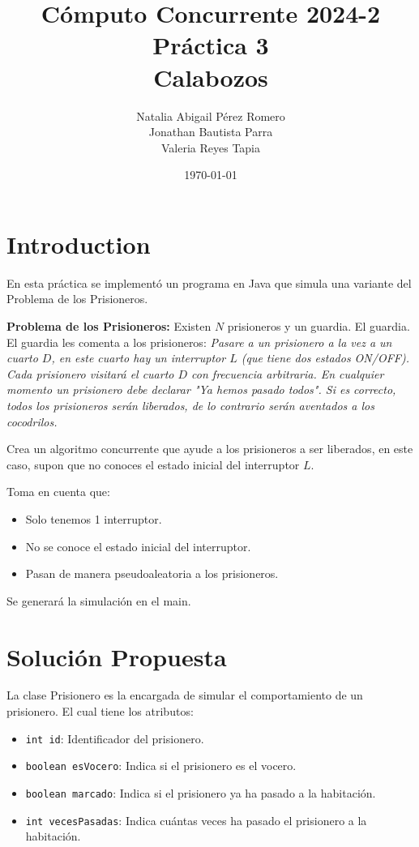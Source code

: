 \documentclass{article}
\title{Cómputo Concurrente 2024-2 \\ Práctica 3 \\  Calabozos}
\author{Natalia Abigail Pérez Romero\\
Jonathan Bautista Parra \\ Valeria Reyes Tapia}
\date{\today}
\begin{document}
\maketitle
\section{Introduction}
En esta práctica se implementó un programa en Java que simula una variante del Problema de los Prisioneros.

\textbf{Problema de los Prisioneros:} Existen $N$ prisioneros y un guardia. El 
guardia. El guardia les comenta a los prisioneros: \textit{Pasare a un prisionero a la vez a un cuarto $D$, en este cuarto hay un interruptor $L$ (que tiene dos estados ON/OFF). Cada prisionero visitará el cuarto $D$ con frecuencia arbitraria. En cualquier momento un prisionero debe declarar "Ya hemos pasado todos". Si es correcto, todos los prisioneros serán liberados, de lo contrario serán aventados a los cocodrilos.}

Crea un algoritmo concurrente que ayude a los prisioneros a ser liberados, en este caso, supon que no conoces el estado inicial del interruptor $L$.

Toma en cuenta que:
\begin{itemize}
    \item Solo tenemos 1 interruptor.
    \item No se conoce el estado inicial del interruptor.
    \item Pasan de manera pseudoaleatoria a los prisioneros.
\end{itemize}

Se generará la simulación en el main.

\section{Solución Propuesta}
La clase Prisionero es la encargada de simular el comportamiento de un prisionero. El cual tiene los atributos:
\begin{itemize}
    \item \texttt{int id}: Identificador del prisionero.
    \item \texttt{boolean esVocero}: Indica si el prisionero es el vocero.
    \item \texttt{boolean marcado}: Indica si el prisionero ya ha pasado a la habitación.
    \item \texttt{int vecesPasadas}: Indica cuántas veces ha pasado el prisionero a la habitación.
\end{itemize}
\end{document}

